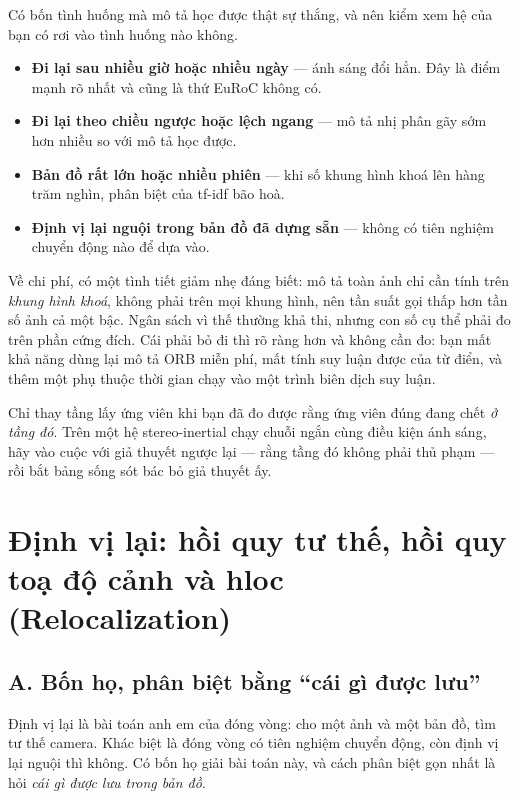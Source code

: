 \documentclass[../../deep_learning.tex]{subfiles}
\begin{document}
Có bốn tình huống mà mô tả học được thật sự thắng, và nên kiểm xem hệ của bạn có rơi vào tình huống nào không.

\begin{itemize}
\item \textbf{Đi lại sau nhiều giờ hoặc nhiều ngày} --- ánh sáng đổi hẳn. Đây là điểm mạnh rõ nhất và cũng là thứ EuRoC không có.
\item \textbf{Đi lại theo chiều ngược hoặc lệch ngang} --- mô tả nhị phân gãy sớm hơn nhiều so với mô tả học được.
\item \textbf{Bản đồ rất lớn hoặc nhiều phiên} --- khi số khung hình khoá lên hàng trăm nghìn, phân biệt của tf-idf bão hoà.
\item \textbf{Định vị lại nguội trong bản đồ đã dựng sẵn} --- không có tiên nghiệm chuyển động nào để dựa vào.
\end{itemize}

Về chi phí, có một tình tiết giảm nhẹ đáng biết: mô tả toàn ảnh chỉ cần tính trên \emph{khung hình khoá}, không phải trên mọi khung hình, nên tần suất gọi thấp hơn tần số ảnh cả một bậc. Ngân sách vì thế thường khả thi, nhưng con số cụ thể phải đo trên phần cứng đích. Cái phải bỏ đi thì rõ ràng hơn và không cần đo: bạn mất khả năng dùng lại mô tả ORB miễn phí, mất tính suy luận được của từ điển, và thêm một phụ thuộc thời gian chạy vào một trình biên dịch suy luận.

\begin{cannho}
Chỉ thay tầng lấy ứng viên khi bạn đã đo được rằng ứng viên đúng đang chết \emph{ở tầng đó}. Trên một hệ stereo-inertial chạy chuỗi ngắn cùng điều kiện ánh sáng, hãy vào cuộc với giả thuyết ngược lại --- rằng tầng đó không phải thủ phạm --- rồi bắt bảng sống sót bác bỏ giả thuyết ấy. 
\end{cannho}

\section{Định vị lại: hồi quy tư thế, hồi quy toạ độ cảnh và hloc (Relocalization)}

\subsection{A. Bốn họ, phân biệt bằng ``cái gì được lưu''}
Định vị lại là bài toán anh em của đóng vòng: cho một ảnh và một bản đồ, tìm tư thế camera. Khác biệt là đóng vòng có tiên nghiệm chuyển động, còn định vị lại nguội thì không. Có bốn họ giải bài toán này, và cách phân biệt gọn nhất là hỏi \emph{cái gì được lưu trong bản đồ}.
\end{document}
